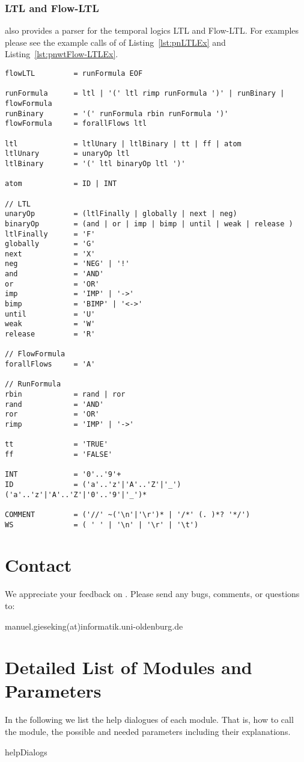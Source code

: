 \documentclass[12pt,twoside,a4paper,openright]{memoir}
\begin{document}
\subsection{LTL and Flow-LTL}
\tool{} also provides a parser for the temporal logics LTL and Flow-LTL. 
For examples please see the example calls of \tool{} of Listing~\ref{lst:pnLTLEx} and Listing~\ref{lst:pnwtFlow-LTLEx}.
\begin{lstlisting}[captionpos=b, caption=Grammar of the temporal logics Flow-LTL, label = lst:grammar,language=ebnf]
flowLTL 		= runFormula EOF

runFormula 		= ltl | '(' ltl rimp runFormula ')' | runBinary | flowFormula
runBinary 		= '(' runFormula rbin runFormula ')'
flowFormula 	= forallFlows ltl

ltl 			= ltlUnary | ltlBinary | tt | ff | atom
ltlUnary 		= unaryOp ltl
ltlBinary 		= '(' ltl binaryOp ltl ')'

atom 			= ID | INT

// LTL
unaryOp 		= (ltlFinally | globally | next | neg)
binaryOp 		= (and | or | imp | bimp | until | weak | release )
ltlFinally 		= 'F'
globally 		= 'G'
next 			= 'X'
neg 			= 'NEG' | '!'
and 			= 'AND'
or 				= 'OR' 
imp				= 'IMP' | '->'
bimp			= 'BIMP' | '<->'
until 			= 'U'
weak 			= 'W'
release 		= 'R'

// FlowFormula
forallFlows 	= 'A'

// RunFormula
rbin 			= rand | ror
rand 			= 'AND'
ror				= 'OR'
rimp 			= 'IMP' | '->'

tt 				= 'TRUE'
ff 				= 'FALSE'

INT 			= '0'..'9'+
ID  			= ('a'..'z'|'A'..'Z'|'_') ('a'..'z'|'A'..'Z'|'0'..'9'|'_')*

COMMENT			= ('//' ~('\n'|'\r')* | '/*' (. )*? '*/')
WS				= ( ' ' | '\n' | '\r' | '\t')
\end{lstlisting}


\chapter{Contact}
We appreciate your feedback on \tool{}. Please send any bugs, comments, or
questions to:
\begin{center}
 manuel.gieseking(at)informatik.uni-oldenburg.de
\end{center}

\appendix
\chapter{Detailed List of Modules and Parameters}
\label{app:detailedModules}
In the following we list the help dialogues of each module.
That is, how to call the module, the possible 
and needed parameters including their explanations.
\begin{subappendices}
{helpDialogs}
\end{subappendices}
\end{document}
